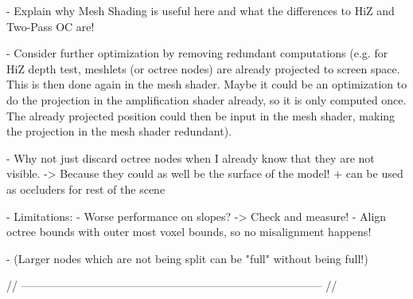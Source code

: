 - Explain why Mesh Shading is useful here and what the differences to HiZ and Two-Pass OC are!

- Consider further optimization by removing redundant computations (e.g. for HiZ depth test, meshlets (or octree nodes)
are already projected to screen space. This is then done again in the mesh shader. Maybe it could be an optimization 
to do the projection in the amplification shader already, so it is only computed once. The already projected position 
could then be input in the mesh shader, making the projection in the mesh shader redundant).

- Why not just discard octree nodes when I already know that they are not visible. -> Because they could as well be the
  surface of the model! + can be used as occluders for rest of the scene

- Limitations: 
    - Worse performance on slopes? -> Check and measure!
    - Align octree bounds with outer most voxel bounds, so no misalignment happens!

    - (Larger nodes which are not being split can be "full" without being full!)

// --------------------------------------------------------------------------------- //
